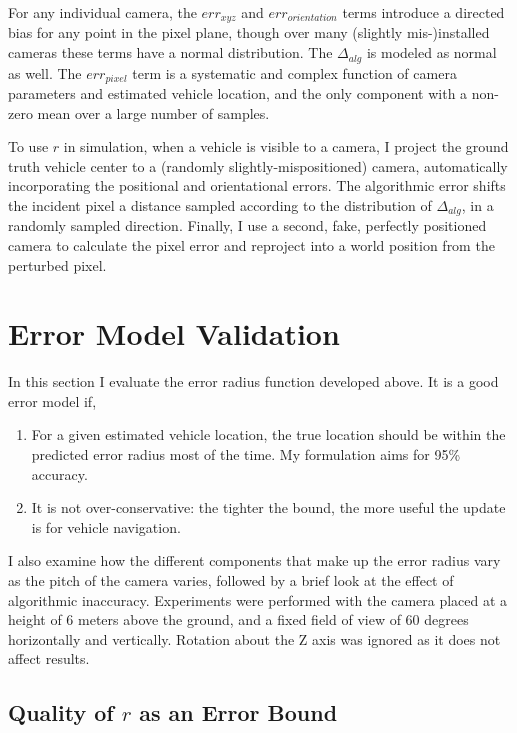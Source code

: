 \documentclass[a4paper,12pt,twoside,openright]{report}
\begin{document}
For any individual camera, the $err_{xyz}$ and $err_{orientation}$ terms introduce
a directed bias for any point in the pixel plane, though over many (slightly mis-)installed cameras
these terms have a normal distribution. The $\Delta_{alg}$ is 
modeled as normal as well. The $err_{pixel}$ term is a systematic 
and complex function of camera parameters and estimated vehicle location, and
the only component with a non-zero mean over a large number of samples.

To use $r$ in simulation, when a vehicle is visible to a camera,
I project the ground truth vehicle center to a (randomly slightly-mispositioned) camera, 
automatically incorporating the positional and orientational errors.
The algorithmic error shifts the incident pixel a distance sampled according to the distribution 
of $\Delta_{alg}$, in a randomly sampled direction. 
Finally, I use a second, fake, perfectly positioned camera 
to calculate the pixel error and reproject into a world position from the perturbed pixel.

\section{Error Model Validation}
\label{sec:camera:validation}

In this section I evaluate the error radius function developed above. It is a good error model if,

\begin{enumerate}
    \item For a given estimated vehicle location, the true location should be within the predicted
          error radius most of the time. My formulation aims for 95\% accuracy.
    \item It is not over-conservative: the tighter the bound, the more useful the update is
          for vehicle navigation.
\end{enumerate}

I also examine how the different components that make up the error radius vary
as the pitch of the camera varies, followed by a brief look at the
effect of algorithmic inaccuracy. Experiments were performed
with the camera placed at a height of 6 meters above the ground, and a fixed
field of view of 60 degrees horizontally and vertically. Rotation about the Z axis
was ignored as it does not affect results.

\subsection{Quality of $r$ as an Error Bound}
\end{document}
